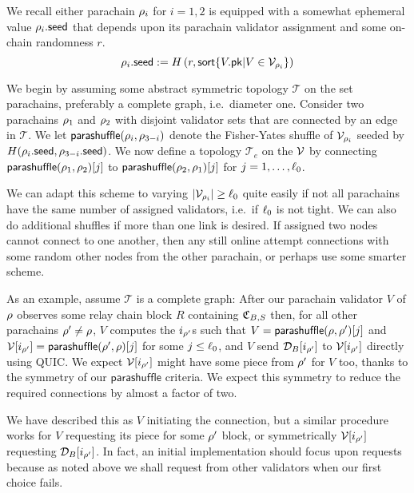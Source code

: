 We recall either parachain $\rho_i$ for $i=1,2$ is equipped with a somewhat ephemeral value $\rho_i.\mathsf{seed}$ that depends upon its parachain validator assignment and some on-chain randomness $r$.
$$ \rho_i.\mathsf{seed} := H\left( r, \mathsf{sort} \{  V.\mathsf{pk}  |  V \in \mathcal{V}_{\rho_i}  \} \right) $$

We begin by assuming some abstract symmetric topology $\mathcal{T}$ on the set parachains, preferably a complete graph, i.e.\ diameter one.  Consider two parachains $\rho_1$ and $\rho_2$ with disjoint validator sets that are connected by an edge in $\mathcal{T}$.  We let $\mathsf{parashuffle}(\rho_i,\rho_{3-i})$ denote the Fisher-Yates shuffle of $\mathcal{V}_{\rho_i}$ seeded by $H( \rho_i.\mathsf{seed}, \rho_{3-i}.\mathsf{seed} )$.  We now define a topology $\mathcal{T}_e$ on the $\mathcal{V}$ by connecting $\mathsf{parashuffle}(\rho_1,\rho_2)[j]$ to $\mathsf{parashuffle}(\rho_2,\rho_1)[j]$ for $j = 1,\ldots,\ell_0$.

We can adapt this scheme to varying $|\mathcal{V}_{\rho_i}| \ge \ell_0$ quite easily if not all parachains have the same number of assigned validators, i.e.\ if $\ell_0$ is not tight.  We can also do additional shuffles if more than one link is desired.  
% 
If assigned two nodes cannot connect to one another, then any still online attempt connections with some random other nodes from the other parachain, or perhaps use some smarter scheme. 

As an example, assume $\mathcal{T}$ is a complete graph:  After our parachain validator $V$ of $\rho$ observes some relay chain block $R$ containing $\mathfrak{C}_{B,S}$ then, for all other parachains $\rho' \ne \rho$, $V$ computes the $i_{\rho'}$s such that $V = \mathsf{parashuffle}(\rho,\rho')[j]$ and $\mathcal{V}[i_{\rho'}] = \mathsf{parashuffle}(\rho',\rho)[j]$ for some $j \leq \ell_0$, and $V$ send $\mathcal{D}_B[i_{\rho'}]$ to $\mathcal{V}[i_{\rho'}]$ directly using QUIC.  We expect $\mathcal{V}[i_{\rho'}]$ might have some piece from $\rho'$ for $V$ too, thanks to the symmetry of our $\mathsf{parashuffle}$ criteria.  We expect this symmetry to reduce the required connections by almost a factor of two.

We have described this as $V$ initiating the connection, but a similar procedure works for $V$ requesting its piece for some $\rho'$ block, or symmetrically $\mathcal{V}[i_{\rho'}]$ requesting $\mathcal{D}_B[i_{\rho'}]$.  In fact, an initial implementation should focus upon requests because as noted above we shall request from other validators when our first choice fails. 

